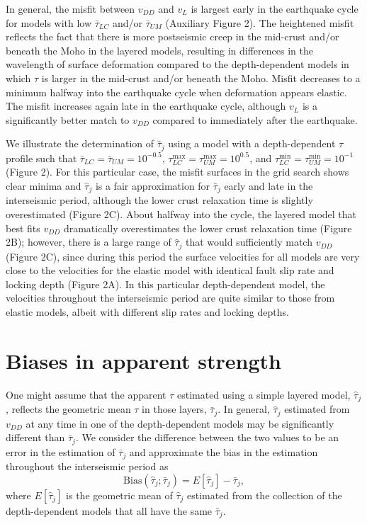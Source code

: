 In general, the misfit between $v_{DD}$ and $v_{L}$ is largest early in the earthquake cycle for models with low $\bar{\tau}_{LC}$ and/or $\bar{\tau}_{UM}$ (Auxiliary Figure 2). The heightened misfit reflects the fact that there is more postseismic creep in the mid-crust and/or beneath the Moho in the layered models, resulting in differences in the wavelength of surface deformation compared to the depth-dependent models in which $\tau$ is larger in the mid-crust and/or beneath the Moho.  Misfit decreases to a minimum halfway into the earthquake cycle when deformation appears elastic.  The misfit increases again late in the earthquake cycle, although $v_{L}$ is a significantly better match to $v_{DD}$ compared to immediately after the earthquake.

We illustrate the determination of $\hat{\tau}_j$ using a model with a depth-dependent $\tau$ profile such that $\bar{\tau}_{LC} = \bar{\tau}_{UM} = 10^{-0.5}$, $\tau_{LC}^{\max} = \tau_{UM}^{\max} = 10^{0.5}$, and  $\tau_{LC}^{\min} = \tau_{UM}^{\min} = 10^{-1}$ (Figure 2). For this particular case, the misfit surfaces in the grid search shows clear minima and $\hat{\tau}_j$ is a fair approximation for $\bar{\tau}_j$ early and late in the interseismic period, although the lower crust relaxation time is slightly overestimated (Figure 2C). About halfway into the cycle, the layered model that best fits $v_{DD}$ dramatically overestimates the lower crust relaxation time (Figure 2B); however, there is a large range of $\hat{\tau}_j$ that would sufficiently match $v_{DD}$ (Figure 2C), since during this period the surface velocities for all models are very close to the velocities for the elastic model with identical fault slip rate and locking depth (Figure 2A). In this particular depth-dependent model, the velocities throughout the interseismic period are quite similar to those from elastic models, albeit with different slip rates and locking depths.

\section{Biases in apparent strength}
One might assume that the apparent $\tau$ estimated using a simple layered model, $\hat{\tau}_j$, reflects the geometric mean $\tau$ in those layers, $\bar{\tau}_j$. In general, $\hat{\tau}_j$ estimated from $v_{DD}$ at any time in one of the depth-dependent models may be significantly different than $\bar{\tau}_j$.  We consider the difference between the two values to be an error in the estimation of $\bar{\tau}_j$ and approximate the bias in the estimation throughout the interseismic period as
\begin{equation}
\mathrm{Bias}(\hat{\tau}_j; \bar{\tau}_j) = E[\hat{\tau}_j] - \bar{\tau}_j,
\label{bias}
\end{equation}
where $E[\hat{\tau}_j]$ is the geometric mean of $\hat{\tau}_j$ estimated from the collection of the depth-dependent models that all have the same $\bar{\tau}_j$. 

